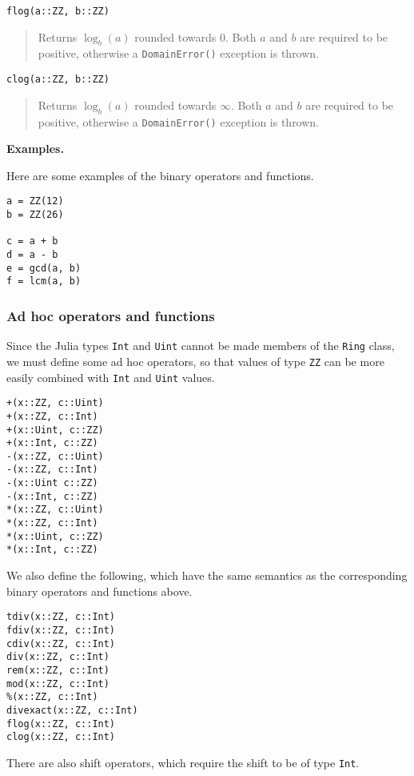 \documentclass[a4paper,10pt]{article}
\newcommand{\code}{\lstinline}
\newcommand{\desc}[1]{\vspace{-3mm}\begin{quote}#1\end{quote}}
\begin{document}
{{{\begin{lstlisting}
flog(a::ZZ, b::ZZ)
\end{lstlisting}

\desc{Returns $\log_b(a)$ rounded towards $0$. Both $a$ and $b$ are required
to be positive, otherwise a \code{DomainError()} exception is thrown.}

\begin{lstlisting}
clog(a::ZZ, b::ZZ)
\end{lstlisting}

\desc{Returns $\log_b(a)$ rounded towards $\infty$. Both $a$ and $b$ are required
to be positive, otherwise a \code{DomainError()} exception is thrown.}

\textbf{Examples.}

Here are some examples of the binary operators and functions.

\begin{lstlisting}
a = ZZ(12)
b = ZZ(26)

c = a + b
d = a - b
e = gcd(a, b)
f = lcm(a, b)
\end{lstlisting}

\subsubsection{Ad hoc operators and functions}

Since the Julia types \code{Int} and \code{Uint} cannot be made members of the
\code{Ring} class, we must define some ad hoc operators, so that values of type
\code{ZZ} can be more easily combined with \code{Int} and \code{Uint} values.

\begin{lstlisting}
+(x::ZZ, c::Uint)
+(x::ZZ, c::Int)
+(x::Uint, c::ZZ)
+(x::Int, c::ZZ)
-(x::ZZ, c::Uint)
-(x::ZZ, c::Int)
-(x::Uint c::ZZ)
-(x::Int, c::ZZ)
*(x::ZZ, c::Uint)
*(x::ZZ, c::Int)
*(x::Uint, c::ZZ)
*(x::Int, c::ZZ)
\end{lstlisting}

We also define the following, which have the same semantics as the corresponding
binary operators and functions above.

\begin{lstlisting}
tdiv(x::ZZ, c::Int)
fdiv(x::ZZ, c::Int)
cdiv(x::ZZ, c::Int)
div(x::ZZ, c::Int)
rem(x::ZZ, c::Int)
mod(x::ZZ, c::Int)
%(x::ZZ, c::Int)
divexact(x::ZZ, c::Int)
flog(x::ZZ, c::Int)
clog(x::ZZ, c::Int)
\end{lstlisting}

There are also shift operators, which require the shift to be of type \code{Int}.

}}}
\end{document}
